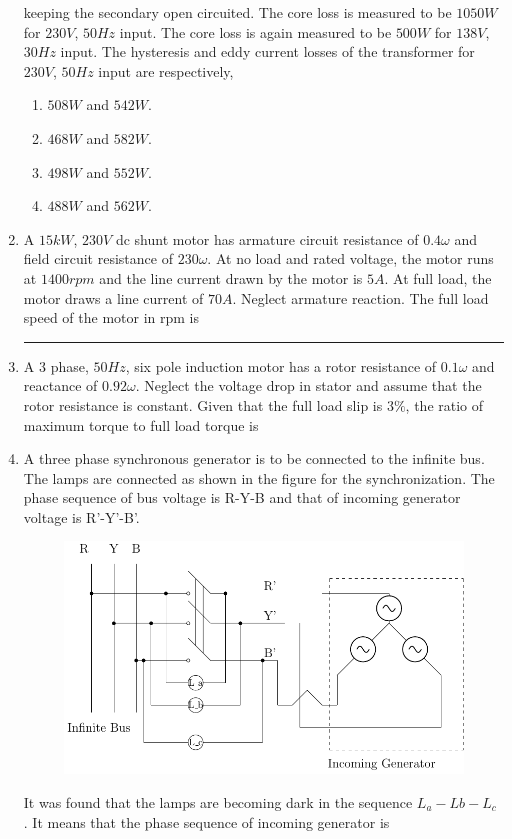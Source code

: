 \documentclass[journal]{IEEEtran}
\begin{document}
\begin{enumerate}
keeping the secondary open circuited. The core loss is measured to be $1050 W$ for $230 V$, $50 Hz$
input. The core loss is again measured to be $500 W$ for $138 V$, $30 Hz$ input. The hysteresis and eddy
current losses of the transformer for $230 V$, $50 Hz$ input are respectively,
		\begin{enumerate}
		       \item $508 W$ and $542 W$. 
		       \item $468 W$ and $582 W$.
		       \item $498 W$ and $552 W$. 
		       \item $488 W$ and $562 W$.
        	\end{enumerate}	
	\item A $15 kW$, $230 V$ dc shunt motor has armature circuit resistance of $0.4 \omega$ and field circuit resistance
of $230 \omega$. At no load and rated voltage, the motor runs at $1400 rpm$ and the line current drawn by
the motor is $5 A$. At full load, the motor draws a line current of $70 A$. Neglect armature reaction.
The full load speed of the motor in rpm is \rule{1cm}{0.15mm}
    
	\item  A $3$ phase, $50 Hz$, six pole induction motor has a rotor resistance of $0.1 \omega$ and reactance of $0.92\omega$.
Neglect the voltage drop in stator and assume that the rotor resistance is constant. Given that the
full load slip is $3\%$, the ratio of maximum torque to full load torque is 
		\begin{enumerate}
        	\end{enumerate}	
	\item A three phase synchronous generator is to be connected to the infinite bus. The lamps are connected
as shown in the figure for the synchronization. The phase sequence of bus voltage is R-Y-B and
that of incoming generator voltage is R'-Y'-B'.

\begin{figure}[h!]
            \centering
            \includegraphics[width=0.5\linewidth]{fig/fig3.pdf}
        \end{figure}
It was found that the lamps are becoming dark in the sequence $L_a -Lb -L_c$ . It means that the phase
sequence of incoming generator is
                \begin{enumerate}
                

\end{enumerate}
\end{enumerate}
\end{document}
